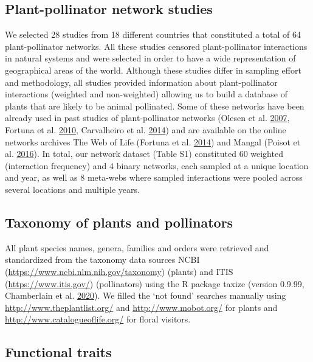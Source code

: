 \documentclass[12pt,a4paper,]{article}
\begin{document}
\subsection{Plant-pollinator network
studies}\label{plant-pollinator-network-studies}

We selected 28 studies from 18 different countries that constituted a
total of 64 plant-pollinator networks. All these studies censored
plant-pollinator interactions in natural systems and were selected in
order to have a wide representation of geographical areas of the world.
Although these studies differ in sampling effort and methodology, all
studies provided information about plant-pollinator interactions
(weighted and non-weighted) allowing us to build a database of plants
that are likely to be animal pollinated. Some of these networks have
been already used in past studies of plant-pollinator networks (Olesen
et al. \protect\hyperlink{ref-olesen2007}{2007}, Fortuna et al.
\protect\hyperlink{ref-fortuna2010}{2010}, Carvalheiro et al.
\protect\hyperlink{ref-carvalheiro2014}{2014}) and are available on the
online networks archives The Web of Life (Fortuna et al.
\protect\hyperlink{ref-fortuna2014}{2014}) and Mangal (Poisot et al.
\protect\hyperlink{ref-poisot2016}{2016}). In total, our network dataset
(Table S1) constituted 60 weighted (interaction frequency) and 4 binary
networks, each sampled at a unique location and year, as well as 8
meta-webs where sampled interactions were pooled across several
locations and multiple years.

\subsection{Taxonomy of plants and
pollinators}\label{taxonomy-of-plants-and-pollinators}

All plant species names, genera, families and orders were retrieved and
standardized from the taxonomy data sources NCBI
(\url{https://www.ncbi.nlm.nih.gov/taxonomy}) (plants) and ITIS
(\url{https://www.itis.gov/}) (pollinators) using the R package taxize
(version 0.9.99, Chamberlain et al.
\protect\hyperlink{ref-chamberlain2020}{2020}). We filled the `not
found' searches manually using \url{http://www.theplantlist.org/} and
\url{http://www.mobot.org/} for plants and
\url{http://www.catalogueoflife.org/} for floral visitors.

\subsection{Functional traits}\label{functional-traits}
\end{document}
